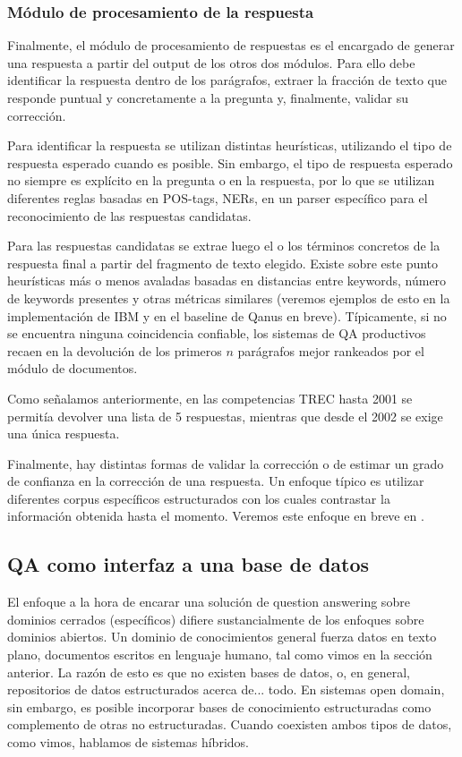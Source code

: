 \subsubsection*{Módulo de procesamiento de la respuesta}
Finalmente, el módulo de procesamiento de respuestas es el encargado de generar una respuesta a partir del output de los otros dos módulos. Para ello debe identificar la respuesta dentro de los parágrafos, extraer la fracción de texto que responde puntual y concretamente a la pregunta y, finalmente, validar su corrección.

Para identificar la respuesta se utilizan distintas heurísticas, utilizando el tipo de respuesta esperado cuando es posible. Sin embargo, el tipo de respuesta esperado no siempre es explícito en la pregunta o en la respuesta, por lo que se utilizan diferentes reglas basadas en POS-tags, NERs, en un parser específico para el reconocimiento de las respuestas candidatas.

Para las respuestas candidatas se extrae luego el o los términos concretos de la respuesta final a partir del fragmento de texto elegido. Existe sobre este punto heurísticas más o menos avaladas basadas en distancias entre keywords, número de keywords presentes y otras métricas similares (veremos ejemplos de esto en la implementación de IBM y en el baseline de Qanus en breve). Típicamente, si no se encuentra ninguna coincidencia confiable, los sistemas de QA productivos recaen en la devolución de los primeros $n$ parágrafos mejor rankeados por el módulo de documentos.

Como señalamos anteriormente, en las competencias TREC hasta 2001 se permitía devolver una lista de 5 respuestas, mientras que desde el 2002 se exige una única respuesta.

Finalmente, hay distintas formas de validar la corrección o de estimar un grado de confianza en la corrección de una respuesta. Un enfoque típico es utilizar diferentes corpus específicos estructurados con los cuales contrastar la información obtenida hasta el momento. Veremos este enfoque en breve en .

\subsection{QA como interfaz a una base de datos}
\label{subsec:closed-domain}
El enfoque a la hora de encarar una solución de question answering sobre dominios cerrados (específicos) difiere sustancialmente de los enfoques sobre dominios abiertos. Un dominio de conocimientos general fuerza datos en texto plano, documentos escritos en lenguaje humano, tal como vimos en la sección anterior. La razón de esto es que no existen bases de datos, o, en general, repositorios de datos estructurados acerca de... todo. En sistemas open domain, sin embargo, es posible incorporar bases de conocimiento estructuradas como complemento de otras no estructuradas. Cuando coexisten ambos tipos de datos, como vimos, hablamos de sistemas híbridos.

